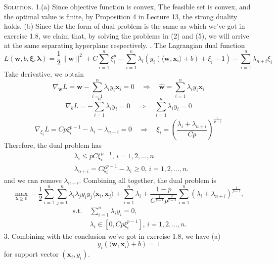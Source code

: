 \documentclass[12pt, a4paper, oneside]{ctexart}
\newenvironment{solution}{\par\noindent\textsc{Solution. }}{\\\par}
\begin{document}
\begin{solution}
	1.(a) Since objective function is convex, The feasible set is convex, and the optimal value is finite, by Proposition 4 in Lecture 13, the strong duality holds.
	\newline\newline
	(b) Since the the form of dual problem is the same as which we've got in exercise 1.8, we claim that, by solving the problems in (2) and (5), we will arrive at the same separating hyperplane respectively.
	\newline{}. The Lagrangian dual function
	\[
	L(\mathbf{w},b,\boldsymbol{\xi},\boldsymbol{\lambda}) = \frac{1}{2}\|\mathbf{w}\|^2 + C\sum_{i=1}^{n}\xi_i^p - \sum_{i=1}^{n}\lambda_i(y_i(\langle\mathbf{w},\mathbf{x}_i\rangle + b)+\xi_i-1) - \sum_{i=1}^{n}\lambda_{n+i}\xi_i
	\]
	Take derivative, we obtain
	\[
    \nabla_\mathbf{w}L = \mathbf{w} - \sum_{i=1}^{n} \lambda_i y_i \mathbf{x}_i = 0 \quad \Rightarrow \quad \hat{\mathbf{w}} = \sum_{i=1}^{n} \lambda_i y_i \mathbf{x}_i
    \]
    \[
    \nabla_bL = -\sum_{i=1}^{n}\lambda_i y_i = 0 \quad \Rightarrow \quad \sum_{i=1}^{n}\lambda_i y_i = 0
    \]
    \[
    \nabla_{\xi_i}L = Cp\xi_i^{p-1}-\lambda_i-\lambda_{n+i} = 0 \quad \Rightarrow \quad \xi_i = (\frac{\lambda_i+\lambda_{n+i}}{Cp})^{\frac{1}{p-1}}
    \]
   	Therefore, the dual problem has
   	\begin{align*}
   		& \lambda_i \leq pC\xi_i^{p-1},\, i = 1,2,\dots,n. \\
   		& \lambda_{n+i} = C\xi_i^{p-1}-\lambda_i \geq 0,\, i = 1,2,\dots,n.
   	\end{align*}
   	and we can remove $\lambda_{n+i}$. \newline
    Combining all together, the dual problem is
    \[
    \max\limits_{\boldsymbol{\lambda}\geq0} -\frac{1}{2}\sum_{i=1}^{n}\sum_{j=1}^{n}\lambda_i\lambda_jy_iy_j\langle\mathbf{x}_i,\mathbf{x}_j\rangle + \sum_{i=1}^{n}\lambda_i + \frac{1-p}{C^\frac{1}{p-1}p^\frac{p}{p-1}}\sum_{i=1}^{n}(\lambda_i+\lambda_{n+i})^\frac{1}{p-1},
    \]
    \begin{align*}
    \text{ s.t. } & \sum_{i=1}^{n}\lambda_i y_i = 0, \\
    & \lambda_i \in [0,Cp\xi_i^{p-1}],\, i = 1,2,\dots,n.
    \end{align*}
    3. Combining with the conclusion we've got in exercise 1.8, we have \newline
    (a)
    \[
    y_i(\langle\mathbf{w},\mathbf{x}_i\rangle + b) = 1
    \]
    for support vector $(\mathbf{x}_i,y_i)$.

\end{solution}
\end{document}

